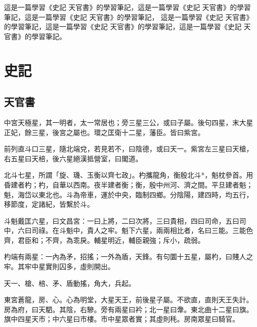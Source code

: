 \documentclass[10pt,fontset=adobe,UTF8,twoside]{ctexrep}
\begin{document}
\pagestyle{fancy}
\fancyhf{}
\fancyhead[RE]{\normalfont\small\hei\nouppercase{\leftmark}}
\fancyhead[LO]{\normalfont\small\kai\nouppercase{\rightmark}}
\fancyhead[LE,RO]{\thepage}

\makeatletter
\@openrightfalse
\makeatother


\begin{cabstract}
   這是一篇學習《史記 天官書》的學習筆記，這是一篇學習《史記 天官書》的學習筆記，這是一篇學習《史記 天官書》的學習筆記，
   這是一篇學習《史記 天官書》的學習筆記，這是一篇學習《史記 天官書》的學習筆記，這是一篇學習《史記 天官書》的學習筆記。
\end{cabstract}

\tableofcontents
{}
\setcounter{page}{1}
\newpage
{}
\setcounter{page}{1}
\chapter{史記}

\section{天官書}

中宮天極星，其一明者，太一常居也；旁三星三公，或曰子屬。後句四星，末大星正妃，餘三星，後宮之屬也。環之匡衛十二星，藩臣。皆曰紫宮。

前列直斗口三星，隨北端兌，若見若不，曰陰德，或曰天一。紫宮左三星曰天槍，右五星曰天棓，後六星絕漢抵營室，曰閣道。

北斗七星，所謂「旋、璣、玉衡以齊七政」。杓攜龍角，衡殷北斗*，魁枕參首。用昏建者杓；杓，自華以西南。夜半建者衡；衡，殷中州河、濟之間。平旦建者魁；魁，海岱以東北也。斗為帝車，運於中央，臨制四鄉。分陰陽，建四時，均五行，移節度，定諸紀，皆繫於斗。

斗魁戴匡六星，曰文昌宮：一曰上將，二曰次將，三曰貴相，四曰司命，五曰司中，六曰司祿。在斗魁中，貴人之牢。魁下六星，兩兩相比者，名曰三能。三能色齊，君臣和；不齊，為乖戾。輔星明近，輔臣親強；斥小，疏弱。

杓端有兩星：一內為矛，招搖；一外為盾，天鋒。有句圜十五星，屬杓，曰賤人之牢。其牢中星實則囚多，虛則開出。

天一、槍、棓、矛、盾動搖，角大，兵起。

東宮蒼龍，房、心。心為明堂，大星天王，前後星子屬。不欲直，直則天王失計。房為府，曰天駟。其陰，右驂。旁有兩星曰衿；北一星曰舝。東北曲十二星曰旗。旗中四星天市；中六星曰市樓。市中星眾者實；其虛則秏。房南眾星曰騎官。
\end{document}
